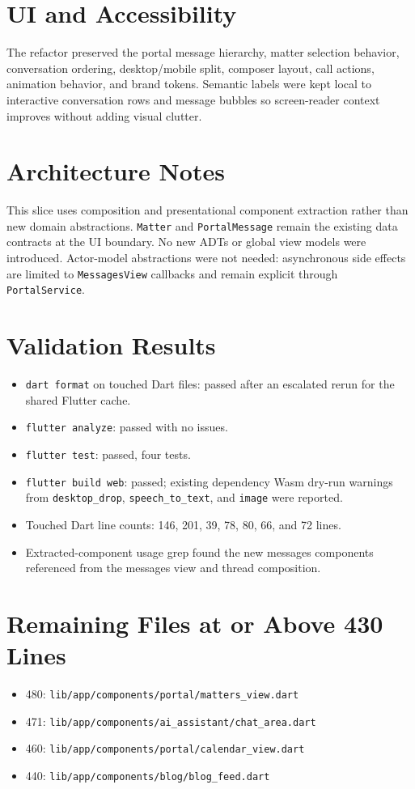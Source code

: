 \documentclass[11pt]{article}
\begin{document}
\section*{UI and Accessibility}
The refactor preserved the portal message hierarchy, matter selection behavior,
conversation ordering, desktop/mobile split, composer layout, call actions,
animation behavior, and brand tokens. Semantic labels were kept local to
interactive conversation rows and message bubbles so screen-reader context
improves without adding visual clutter.

\section*{Architecture Notes}
This slice uses composition and presentational component extraction rather than
new domain abstractions. \texttt{Matter} and \texttt{PortalMessage} remain the
existing data contracts at the UI boundary. No new ADTs or global view models
were introduced. Actor-model abstractions were not needed: asynchronous side
effects are limited to \texttt{MessagesView} callbacks and remain explicit
through \texttt{PortalService}.

\section*{Validation Results}
\begin{itemize}
  \item \texttt{dart format} on touched Dart files: passed after an escalated
  rerun for the shared Flutter cache.
  \item \texttt{flutter analyze}: passed with no issues.
  \item \texttt{flutter test}: passed, four tests.
  \item \texttt{flutter build web}: passed; existing dependency Wasm dry-run
  warnings from \texttt{desktop\_drop}, \texttt{speech\_to\_text}, and
  \texttt{image} were reported.
  \item Touched Dart line counts: 146, 201, 39, 78, 80, 66, and 72 lines.
  \item Extracted-component usage grep found the new messages components
  referenced from the messages view and thread composition.
\end{itemize}

\section*{Remaining Files at or Above 430 Lines}
\begin{itemize}
  \item 480: \texttt{lib/app/components/portal/matters\_view.dart}
  \item 471: \texttt{lib/app/components/ai\_assistant/chat\_area.dart}
  \item 460: \texttt{lib/app/components/portal/calendar\_view.dart}
  \item 440: \texttt{lib/app/components/blog/blog\_feed.dart}
\end{itemize}
\end{document}
